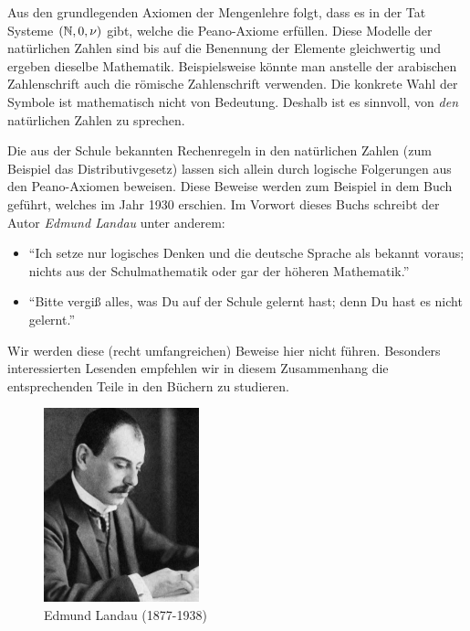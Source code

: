 \bemerkungen{-}{}
{Aus den grundlegenden Axiomen der Mengenlehre folgt, dass es in der Tat Systeme $(\mathbb{N},0,\nu)$ gibt, welche die Peano-Axiome erfüllen. Diese Modelle der natürlichen Zahlen sind bis auf die Benennung der Elemente gleichwertig und ergeben dieselbe Mathematik. Beispielsweise könnte man anstelle der arabischen Zahlenschrift auch die römische Zahlenschrift verwenden. Die konkrete Wahl der Symbole ist mathematisch nicht von Bedeutung. Deshalb ist es sinnvoll, von \textit{den} natürlichen Zahlen zu sprechen.}
{Die aus der Schule bekannten Rechenregeln in den natürlichen Zahlen (zum Beispiel das Distributivgesetz) lassen sich allein durch logische Folgerungen aus den Peano-Axiomen beweisen. Diese Beweise werden zum Beispiel in dem Buch \cite{Landau} geführt, welches im Jahr 1930 erschien. Im Vorwort dieses Buchs schreibt der Autor \textit{Edmund Landau} unter anderem:
\begin{itemize}
    \item \enquote{Ich setze nur logisches Denken und die deutsche Sprache als bekannt voraus; nichts aus der Schulmathematik oder gar der höheren Mathematik.}
    \item \enquote{Bitte vergiß alles, was Du auf der Schule gelernt hast; denn Du hast es nicht gelernt.}
\end{itemize}
Wir werden diese (recht umfangreichen) Beweise hier nicht führen. Besonders interessierten Lesenden empfehlen wir in diesem Zusammenhang die entsprechenden Teile in den Büchern \cite{Landau,TerenceTao,AmannEscher1} zu studieren.}

\begin{figure}[H]
    \centering
    \includegraphics[width=0.4\textwidth]{Landau.jpg}
    \caption{Edmund Landau (1877-1938)}
    \label{fig:Landau}
\end{figure}





